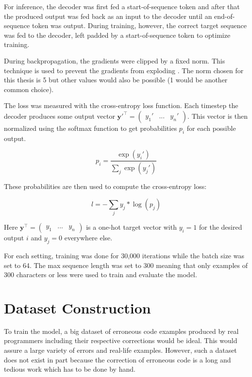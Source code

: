 For inference, the decoder was first fed a start-of-sequence token and after that the produced output was fed back as an input to the decoder until an end-of-sequence token was output. During training, however, the correct target sequence was fed to the decoder, left padded by a start-of-sequence token to optimize training.

 During backpropagation, the gradients were clipped by a fixed norm. This technique is used to prevent the gradients from exploding \cite{gradient_clipping}. The norm chosen for this thesis is 5 but other values would also be possible (1 would be another common choice).

 The loss was measured with the cross-entropy loss function. Each timestep the decoder produces some output vector \(\mathbf{y}'^\intercal = \begin{pmatrix} y_1' & ... & y_n'\end{pmatrix}\). This vector is then normalized using the softmax function to get probabilities \(p_i\) for each possible output.

 \begin{equation*}
   p_i = \frac
             {\exp(y_i')}
             {\sum_{j} \exp(y_j')}
 \end{equation*}

 These probabilities are then used to compute the cross-entropy loss:

 \begin{equation*}
   l = - \sum_{j} y_j * \log(p_j)
 \end{equation*}

 Here \(\mathbf{y}^\intercal = \begin{pmatrix} y_1 & ... & y_n \end{pmatrix}\) is a one-hot target vector with \(y_i = 1\) for the desired output \(i\) and \(y_j = 0\) everywhere else.

 For each setting, training was done for 30,000 iterations while the batch size was set to 64. The max sequence length was set to 300 meaning that only examples of 300 characters or less were used to train and evaluate the model.

\section{Dataset Construction}

To train the model, a big dataset of erroneous code examples produced by real programmers including their respective corrections would be ideal. This would assure a large variety of errors and real-life examples. However, such a dataset does not exist in part because the correction of erroneous code is a long and tedious work which has to be done by hand.

